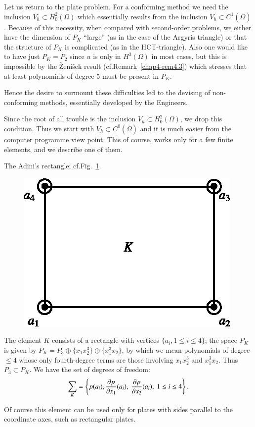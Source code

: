 Let us return to the plate problem. For a conforming method we need
the inclusion $V_{h}\subset H^{2}_{0}(\Omega)$ which essentially
results from the inclusion $V_{h}\subset
C^{1}(\overline{\Omega})$. Because of this necessity, when compared
with second-order problems, we either have the dimension of $P_{K}$
``large'' (as in the case of the Argyris triangle) or that the
structure of $P_{K}$ is complicated (as in the HCT-triangle). Also one
would like to have just $P_{K}=P_{2}$ since $u$ is only in
$H^{3}(\Omega)$ in most cases, but this is impossible by the
\v{Z}eni\v{s}ek result (cf.\@ Remark~\ref{chap4-rem4.3}) which
stresses that at least polynomials of degree 5 must be present in
$P_{K}$.

Hence the desire to surmount these difficulties led to the devising of
non-conforming methods, essentially developed by the Engineers.

Since the root of all trouble is the inclusion $V_{h}\subset
H^{2}_{0}(\Omega)$, we drop this condition. Thus we start with
$V_{h}\subset C^{0}(\overline{\Omega})$ and it is much easier from the
computer programme view point. This of course, works only for a few
finite elements, and we describe one of them.

\begin{example}\label{chap11-exam11.1}
The Adini's rectangle; cf.\@ Fig.~\ref{chap11-fig11.1}.
\begin{figure}[H]
\centering
\includegraphics{figure/fig11.1.eps}
\caption{}\label{chap11-fig11.1}
\end{figure}

The element $K$ consists of a rectangle with vertices $\{a_{i},1\leq
i\leq 4\}$; the space $P_{K}$ is given by $P_{K}=P_{3}\oplus
\{x_{1}x^{3}_{2}\}\oplus \{x^{3}_{1}x_{2}\}$, by which we mean
polynomials of degree $\leq 4$ whose only fourth-degree terms are
those involving $x_{1}x^{3}_{2}$ and $x^{3}_{1}x_{2}$. Thus
$P_{3}\subset P_{K}$. We have the set of degrees of freedom:
$$
\sum_{K}=\left\{p(a_{i}),\frac{\partial p}{\partial x_{1}}(a_{i}),\ \frac{\partial p}{\partial
  x_{2}}(a_{i}),\ 1\leq i\leq 4\right\}.
$$\pageoriginale

Of course this element can be used only for plates with sides parallel
to the coordinate axes, such as rectangular plates.
\end{example}

